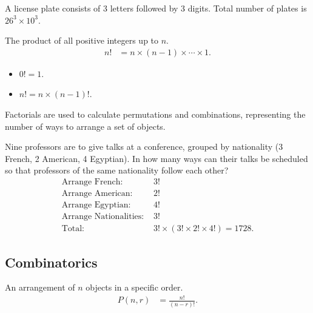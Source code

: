 \documentclass{article}
\begin{document}
\begin{example}
A license plate consists of 3 letters followed by 3 digits. Total number of plates is $26^3 \times 10^3$.
\end{example}

\begin{definition}[Factorial]
The product of all positive integers up to $n$.
\begin{align*}
    n! &= n \times (n-1) \times \cdots \times 1.
\end{align*}
\end{definition}

\begin{remark}
\begin{itemize}
    \item $0! = 1$.
    \item $n! = n \times (n-1)!$.
\end{itemize}
Factorials are used to calculate permutations and combinations, representing the number of ways to arrange a set of objects.
\end{remark}

\begin{example}
Nine professors are to give talks at a conference, grouped by nationality (3 French, 2 American, 4 Egyptian). In how many ways can their talks be scheduled so that professors of the same nationality follow each other?
\begin{align*}
    \text{Arrange French: } &3! \\
    \text{Arrange American: } &2! \\
    \text{Arrange Egyptian: } &4! \\
    \text{Arrange Nationalities: } &3! \\
    \text{Total: } &3! \times (3! \times 2! \times 4!) = 1728.
\end{align*}
\end{example}

\subsection{Combinatorics}
\begin{definition}[Permutation]
An arrangement of $n$ objects in a specific order.
\begin{align*}
    P(n, r) &= \frac{n!}{(n-r)!}.
\end{align*}
\end{definition}
\end{document}
